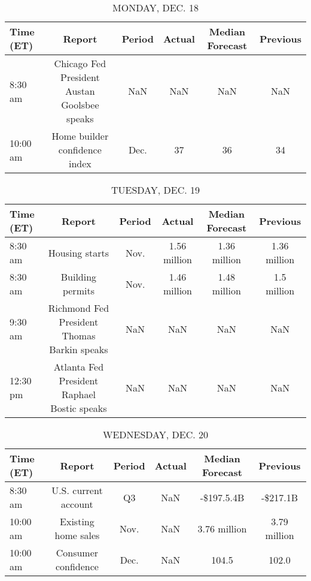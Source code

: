 \documentclass{article}%
\begin{document}
%
\normalsize%


\begin{table}[htbp]%
\caption{MONDAY, DEC. 18}%
\centering%
\begin{adjustbox}{width=1\textwidth}%
\begin{tabular}{lccccc}
\toprule
Time (ET) &                                       Report & Period & Actual & Median Forecast & Previous \\
\midrule
  8:30 am & Chicago Fed President Austan Goolsbee speaks &    NaN &    NaN &             NaN &      NaN \\
 10:00 am &                Home builder confidence index &   Dec. &     37 &              36 &       34 \\
\bottomrule
\end{tabular}
%
\end{adjustbox}%
\end{table}

%


\begin{table}[htbp]%
\caption{TUESDAY, DEC. 19}%
\centering%
\begin{adjustbox}{width=1\textwidth}%
\begin{tabular}{lccccc}
\toprule
Time (ET) &                                      Report & Period &       Actual & Median Forecast &     Previous \\
\midrule
  8:30 am &                              Housing starts &   Nov. & 1.56 million &    1.36 million & 1.36 million \\
  8:30 am &                            Building permits &   Nov. & 1.46 million &    1.48 million &  1.5 million \\
  9:30 am & Richmond Fed President Thomas Barkin speaks &    NaN &          NaN &             NaN &          NaN \\
 12:30 pm & Atlanta Fed President Raphael Bostic speaks &    NaN &          NaN &             NaN &          NaN \\
\bottomrule
\end{tabular}
%
\end{adjustbox}%
\end{table}

%


\begin{table}[htbp]%
\caption{WEDNESDAY, DEC. 20}%
\centering%
\begin{adjustbox}{width=1\textwidth}%
\begin{tabular}{lccccc}
\toprule
Time (ET) &               Report & Period & Actual & Median Forecast &     Previous \\
\midrule
  8:30 am & U.S. current account &     Q3 &    NaN &      -\$197.5.4B &     -\$217.1B \\
 10:00 am &  Existing home sales &   Nov. &    NaN &    3.76 million & 3.79 million \\
 10:00 am &  Consumer confidence &   Dec. &    NaN &           104.5 &        102.0 \\
\bottomrule
\end{tabular}
%
\end{adjustbox}%
\end{table}
\end{document}
